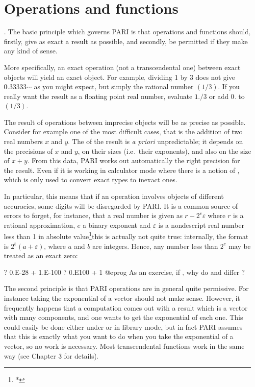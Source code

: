 \section{Operations and functions}

.
The basic principle which governs PARI is that operations and functions
should, firstly, give as exact a result as possible, and secondly, be
permitted if they make any kind of sense.

More specifically, an exact operation (not a transcendental one) between
exact objects will yield an exact object. For example, dividing 1 by 3
does not give $0.33333\cdots$ as you might expect, but simply the rational
number $(1/3)$. If you really want the result as a floating point real
number, evaluate $1./3$ or add $0.$ to $(1/3)$.

The result of operations between imprecise objects will be as precise as
possible. Consider for example one of the most difficult cases, that is the
addition of two real numbers $x$ and $y$. The  of the result is
\emph{a priori} unpredictable; it depends on the precisions of $x$ and $y$,
on their sizes (i.e.~their exponents), and also on the size of $x+y$. From
this data, PARI works out automatically the right precision for the result.
Even if it is working in calculator mode  where there is a notion of
, which is only used to convert exact types to inexact
ones.

In particular, this means that if an operation involves objects of
different accuracies, some digits will be disregarded by PARI. It is a
common source of errors to forget, for instance, that a real number is
given as $r + 2^e \varepsilon$ where $r$ is a rational approximation, $e$ a
binary exponent and $\varepsilon$ is a nondescript real number less than 1 in
absolute value\footnote{*}{this is actually not quite true: internally, the
format is $2^b (a + \varepsilon)$, where $a$ and $b$ are integers}. Hence,
any number less than $2^e$ may be treated as an exact zero:

\bprog
? 0.E-28 + 1.E-100
? 0.E100 + 1
@eprog
\noindent As an exercise, if , why do  and
 differ ?

The second principle is that PARI operations are in general quite permissive.
For instance taking the exponential of a vector should not make sense.
However, it frequently happens that a computation comes out with a result
which is a vector with many components, and one wants to get the exponential
of each one. This could easily be done either under  or in library
mode, but in fact PARI assumes that this is exactly what you want to do when
you take the exponential of a vector, so no work is necessary. Most
transcendental functions work in the same way (see Chapter 3 for details).

